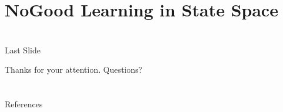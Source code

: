 \begin{frame}{}

\end{frame}



%

\section[NoGood Learning]{NoGood Learning in State Space}
\subsection*{}

\begin{frame}{}

\end{frame}




\section*{}

\begin{frame}{Last Slide}

{\centering

Thanks for your attention. Questions?

}

\end{frame}

\section*{}

\begin{frame}[allowframebreaks]{References}
\footnotesize


\end{frame}






